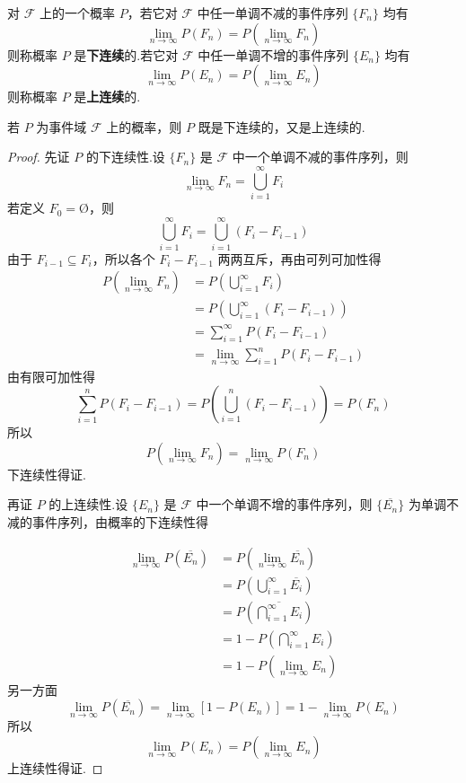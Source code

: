 \begin{definition}
    \indent 对 $\mathcal{F}$ 上的一个概率 $P$，若它对 $\mathcal{F}$ 中任一单调不减的事件序列 $\{F_n\}$ 均有
    $$
    \lim_{n \to \infty} P(F_n) = P(\lim_{n \to \infty} F_n)
    $$
    则称概率 $P$ 是\textbf{下连续}的.若它对 $\mathcal{F}$ 中任一单调不增的事件序列 $\{E_n\}$ 均有
    $$
    \lim_{n \to \infty} P(E_n) = P(\lim_{n \to \infty} E_n)
    $$
    则称概率 $P$ 是\textbf{上连续}的.
\end{definition}

\begin{property}
    \indent 若 $P$ 为事件域 $\mathcal{F}$ 上的概率，则 $P$ 既是下连续的，又是上连续的.
\end{property}

\begin{proof}
    先证 $P$ 的下连续性.设 $\{ F_n \}$ 是 $\mathcal{F}$ 中一个单调不减的事件序列，则
    $$
    \lim_{n \to \infty} F_n = \bigcup_{i=1}^{\infty} F_i
    $$
    若定义 $F_0 = \text{\O}$，则
    $$
    \bigcup_{i=1}^{\infty} F_i = \bigcup_{i=1}^{\infty} (F_i - F_{i-1})
    $$
    由于 $F_{i-1} \subseteq F_i$，所以各个 $F_i - F_{i-1}$ 两两互斥，再由可列可加性得
    $$
    \begin{aligned}
        P(\lim_{n \to \infty} F_n) &= P \left( \bigcup_{i=1}^{\infty} F_i \right) \\
        &= P \left( \bigcup_{i=1}^{\infty} (F_i - F_{i-1}) \right) \\
        &= \sum_{i=1}^{\infty} P(F_i - F_{i-1}) \\
        &= \lim_{n \to \infty} \sum_{i=1}^n P(F_i - F_{i-1})
    \end{aligned}
    $$
    由有限可加性得
    $$
    \sum_{i=1}^n P(F_i - F_{i-1}) = P \left( \bigcup_{i=1}^n (F_i - F_{i-1}) \right) = P(F_n)
    $$
    所以
    $$
    P(\lim_{n \to \infty} F_n) = \lim_{n \to \infty} P(F_n)
    $$
    下连续性得证.

    再证 $P$ 的上连续性.设 $\{ E_n \}$ 是 $\mathcal{F}$ 中一个单调不增的事件序列，则 $\{ \overline{E_n} \}$ 为单调不减的事件序列，由概率的下连续性得

    $$
    \begin{aligned}
        \lim_{n \to \infty} P(\overline{E_n}) &= P(\lim_{n \to \infty} \overline{E_n}) \\
        &= P \left( \bigcup_{i=1}^{\infty} \overline{E_i} \right) \\
        &= P \left(\overline{\bigcap_{i=1}^{\infty} E_i} \right) \\
        &= 1 - P \left(\bigcap_{i=1}^{\infty} E_i \right) \\
        &= 1 - P(\lim_{n \to \infty} E_n)
    \end{aligned}
    $$
    另一方面
    $$
    \lim_{n \to \infty} P(\overline{E_n}) = \lim_{n \to \infty} [1 - P(E_n)] = 1 - \lim_{n \to \infty} P(E_n)
    $$
    所以
    $$
    \lim_{n \to \infty} P(E_n) = P(\lim_{n \to \infty} E_n)
    $$
    上连续性得证.
\end{proof}

